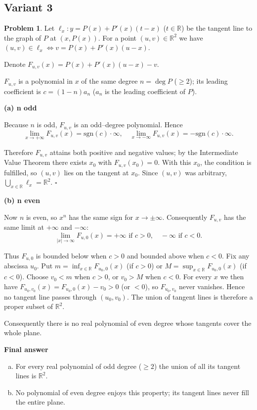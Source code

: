 \documentclass[12pt,a4paper]{article}
\theoremstyle{definition}
\newtheorem{problem}{Problem}
\begin{document}
    \subsection{Variant 3}
    \begin{problem}
        Let $\ell_x : y = P(x)+P'(x)(t-x)$ ($t\in\mathbb{R}$) be the tangent line to the graph of $P$ at $(x ,P(x))$. For a point $(u ,v)\in\mathbb{R}^2$ we have $(u ,v)\in\ell_x \Leftrightarrow v = P(x)+P'(x)(u-x)$.

        Denote $F_{u,v}(x)=P(x)+P'(x)(u-x)-v$.

        $F_{u,v}$ is a polynomial in $x$ of the same degree $n = \deg P$ ($\geq2$); its leading coefficient is $c = (1-n)a_n$ ($a_n$ is the leading coefficient of $P$).

        \textbf{(a) n odd}

        Because $n$ is odd, $F_{u,v}$ is an odd--degree polynomial. Hence
        \[\lim_{x\to+\infty} F_{u,v}(x) = \text{sgn}(c)\cdot\infty , \quad \lim_{x\to-\infty} F_{u,v}(x)= -\text{sgn}(c)\cdot\infty.\]

        Therefore $F_{u,v}$ attains both positive and negative values; by the Intermediate Value Theorem there exists $x_0$ with $F_{u,v}(x_0)=0$. With this $x_0$, the condition is fulfilled, so $(u ,v)$ lies on the tangent at $x_0$. Since $(u ,v)$ was arbitrary, $\bigcup_{x\in\mathbb{R}} \ell_x = \mathbb{R}^2$. $\square$

        \textbf{(b) n even}

        Now $n$ is even, so $x^n$ has the same sign for $x\to\pm\infty$. Consequently $F_{u,v}$ has the same limit at $+\infty$ and $-\infty$:
        \[\lim_{|x|\to\infty} F_{u,0}(x)= +\infty \text{ if } c>0, \quad -\infty \text{ if } c<0.\]

        Thus $F_{u,0}$ is bounded below when $c>0$ and bounded above when $c<0$. Fix any abscissa $u_0$. Put $m = \inf_{x\in\mathbb{R}} F_{u_0,0}(x)$ (if $c>0$) or $M = \sup_{x\in\mathbb{R}} F_{u_0,0}(x)$ (if $c<0$). Choose $v_0 < m$ when $c>0$, or $v_0 > M$ when $c<0$. For every $x$ we then have $F_{u_0,v_0}(x)=F_{u_0,0}(x)-v_0>0$ (or $<0$), so $F_{u_0,v_0}$ never vanishes. Hence no tangent line passes through $(u_0 ,v_0)$. The union of tangent lines is therefore a proper subset of $\mathbb{R}^2$.

        Consequently there is no real polynomial of even degree whose tangents cover the whole plane.

        \textbf{Final answer}
        \begin{enumerate}[(a)]
            \item For every real polynomial of odd degree ($\geq2$) the union of all its tangent lines is $\mathbb{R}^2$.
            \item No polynomial of even degree enjoys this property; its tangent lines never fill the entire plane.
        \end{enumerate}
    \end{problem}
\end{document}
